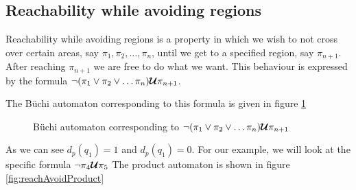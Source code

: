 \subsection{Reachability while avoiding regions} 
Reachability while avoiding regions is a property in which we wish to not cross over certain areas, say $\pi_1, \pi_2, \dots, \pi_n$, until we get to a specified region, say $\pi_{n+1}$. After reaching $\pi_{n+1}$ we are free to do what we want. This behaviour is expressed by the formula $\neg (\pi_1 \lor \pi_2 \lor \dots \pi_n) \bm{\mathcal{U}} \pi_{n+1}$. 

The B\"{u}chi automaton corresponding to this formula is given in figure \ref{fig:ReachAvoid}

\begin{figure}
\centering
{}
\caption{B\"{u}chi automaton corresponding to $\neg (\pi_1 \lor \pi_2 \lor \dots \pi_n) \bm{\mathcal{U}} \pi_{n+1}$}
\label{fig:ReachAvoid}
\end{figure}

As we can see $d_p(q_1)=1$ and $d_p(q_1)=0$. For our example, we will look at the specific formula $\neg \pi_4 \bm{\mathcal{U}} \pi_5$ The product automaton is shown in figure \ref{fig:reachAvoidProduct}

